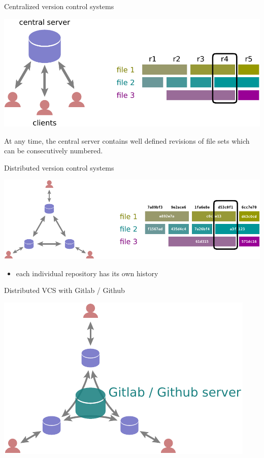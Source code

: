 \documentclass[svgnames]{beamer}
\begin{document}
\begin{frame}{Centralized version control systems}
 \begin{center}
  \includegraphics[width=\textwidth]{cvcs}
 \end{center}

 At any time, the central server contains well defined revisions
 of file sets which can be consecutively numbered.
\end{frame}

\begin{frame}{Distributed version control systems}
 \begin{center}
  \includegraphics[width=\textwidth]{dvcs}
 \end{center}

 \begin{itemize}
  \item each individual repository has its own history
 \end{itemize}
\end{frame}

\begin{frame}{Distributed VCS with Gitlab / Github}
 \begin{center}
  \includegraphics[height=0.6\textheight]{dvcs-github}
 \end{center}
\end{frame}
\end{document}
